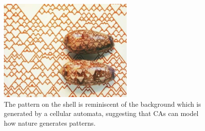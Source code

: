 \begin{figure}[h!]
  \centering
  \includegraphics[width=0.6\textwidth]{fig/CApattern.png}
  \caption{
    The pattern on the shell is reminiscent of the background which is
    generated by a cellular automata, suggesting that CAs can model how nature
    generates patterns.
  }
  \label{figCX}
\end{figure}
